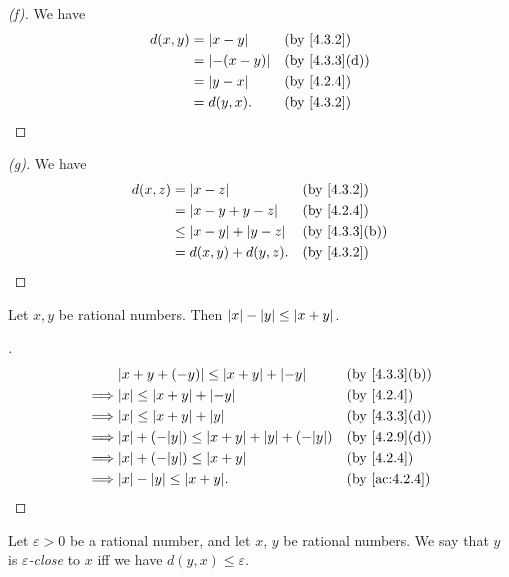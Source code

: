 \begin{proof}[(f)]
  We have
  \begin{align*}
    d(x, y) & = \abs{x - y}    &  & \by{4.3.2}    \\
            & = \abs{-(x - y)} &  & \by{4.3.3}[d] \\
            & = \abs{y - x}    &  & \by{4.2.4}    \\
            & = d(y, x).       &  & \by{4.3.2}
  \end{align*}
\end{proof}

\begin{proof}[(g)]
  We have
  \begin{align*}
    d(x, z) & = \abs{x - z}                  &  & \by{4.3.2}    \\
            & = \abs{x - y + y - z}          &  & \by{4.2.4}    \\
            & \leq \abs{x - y} + \abs{y - z} &  & \by{4.3.3}[b] \\
            & = d(x, y) + d(y, z).           &  & \by{4.3.2}
  \end{align*}
\end{proof}

\begin{ac}\label{ac:4.3.1}
  Let \(x, y\) be rational numbers.
  Then \(\left\lvert x\right\rvert - \left\lvert y\right\rvert \leq \left\lvert x + y\right\rvert\).
\end{ac}

\begin{proof}[]
  \begin{align*}
             & \abs{x + y + (-y)} \leq \abs{x + y} + \abs{-y}               &  & \by{4.3.3}[b] \\
    \implies & \abs{x} \leq \abs{x + y} + \abs{-y}                          &  & \by{4.2.4}    \\
    \implies & \abs{x} \leq \abs{x + y} + \abs{y}                           &  & \by{4.3.3}[d] \\
    \implies & \abs{x} + (-\abs{y}) \leq \abs{x + y} + \abs{y} + (-\abs{y}) &  & \by{4.2.9}[d] \\
    \implies & \abs{x} + (-\abs{y}) \leq \abs{x + y}                        &  & \by{4.2.4}    \\
    \implies & \abs{x} - \abs{y} \leq \abs{x + y}.                          &  & \by{ac:4.2.4}
  \end{align*}
\end{proof}

\begin{defn}\label{4.3.4}
  Let \(\varepsilon > 0\) be a rational number, and let \(x\), \(y\) be rational numbers.
  We say that \(y\) is \emph{\(\varepsilon\)-close} to \(x\) iff we have \(d(y, x) \leq \varepsilon\).
\end{defn}


